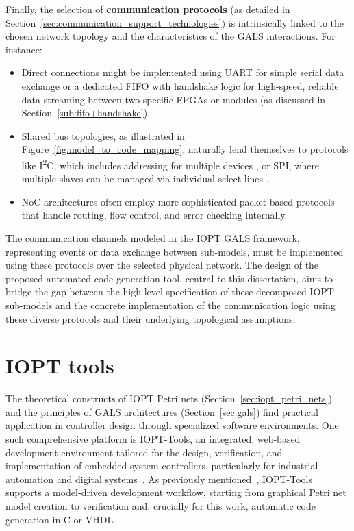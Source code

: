 Finally, the selection of \textbf{communication protocols} (as detailed in Section~\ref{sec:communication_support_technologies}) is intrinsically linked to the chosen network topology and the characteristics of the GALS interactions. For instance:
\begin{itemize}
    \item Direct connections might be implemented using UART for simple serial data exchange \cite{UARTwiki, Rao2021} or a dedicated FIFO with handshake logic for high-speed, reliable data streaming between two specific FPGAs or modules (as discussed in Section~\ref{sub:fifo+handshake}).
    \item Shared bus topologies, as illustrated in Figure~\ref{fig:model_to_code_mapping}, naturally lend themselves to protocols like I\textsuperscript{2}C, which includes addressing for multiple devices \cite{i2c, I2Cv2}, or SPI, where multiple slaves can be managed via individual select lines \cite{spisite, spisite2}.
    \item NoC architectures often employ more sophisticated packet-based protocols that handle routing, flow control, and error checking internally.
\end{itemize}
The communication channels modeled in the IOPT GALS framework, representing events or data exchange between sub-models, must be implemented using these protocols over the selected physical network. The design of the proposed automated code generation tool, central to this dissertation, aims to bridge the gap between the high-level specification of these decomposed IOPT sub-models and the concrete implementation of the communication logic using these diverse protocols and their underlying topological assumptions.








\section{IOPT tools}
\label{sec:iopt_tools}



The theoretical constructs of IOPT Petri nets (Section~\ref{sec:iopt_petri_nets}) and the principles of GALS architectures (Section~\ref{sec:gals}) find practical application in controller design through specialized software environments. One such comprehensive platform is IOPT-Tools, an integrated, web-based development environment tailored for the design, verification, and implementation of embedded system controllers, particularly for industrial automation and digital systems~\cite{iopttools}. As previously mentioned~\cite{iopttools}, IOPT-Tools supports a model-driven development workflow, starting from graphical Petri net model creation to verification and, crucially for this work, automatic code generation in C or VHDL.

